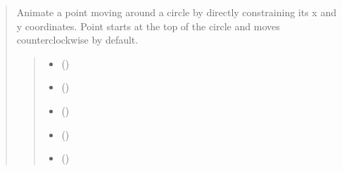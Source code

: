 \documentclass[letterpaper,10pt,english]{sphinxmanual}
\begin{document}
\begin{quote}
\begin{fulllineitems}
\begin{fulllineitems}
\label{\detokenize{pygeox:pygeox.animate.AnimateNamespace.point_sweep_circle}}
\pysigstartsignatures
\pysiglinewithargsret
{}
{\sphinxparamcomma {}\sphinxparamcomma {}\sphinxparamcomma {}\sphinxparamcomma {}}
{}
\pysigstopsignatures
\sphinxAtStartPar
Animate a point moving around a circle by directly constraining its x and y coordinates.
Point starts at the top of the circle and moves counterclockwise by default.
\begin{quote}\begin{description}
\begin{itemize}
\item {} 
\sphinxAtStartPar
{} ()

\item {} 
\sphinxAtStartPar
{} ()

\item {} 
\sphinxAtStartPar
{} ()

\item {} 
\sphinxAtStartPar
{} (\sphinxstyleliteralemphasis{\sphinxupquote{ | }}\sphinxstyleliteralemphasis{\sphinxupquote{ | }}\sphinxstyleliteralemphasis{\sphinxupquote{ | }}\sphinxstyleliteralemphasis{\sphinxupquote{ | }})

\item {} 
\sphinxAtStartPar
{} (\sphinxstyleliteralemphasis{\sphinxupquote{ | }}\sphinxstyleliteralemphasis{\sphinxupquote{ | }}\sphinxstyleliteralemphasis{\sphinxupquote{ | }}\sphinxstyleliteralemphasis{\sphinxupquote{ | }})


\end{itemize}
\end{description}
\end{quote}
\end{fulllineitems}
\end{fulllineitems}
\end{quote}
\end{document}
